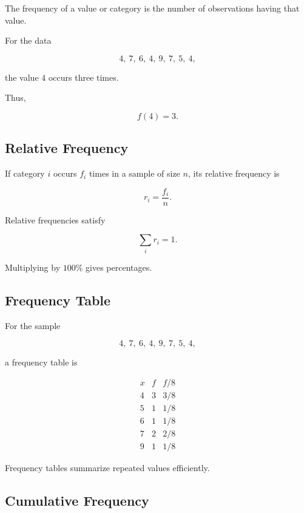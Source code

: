 The frequency of a value or category is the number of observations
having that value.

For the data

\[
4,\ 7,\ 6,\ 4,\ 9,\ 7,\ 5,\ 4,
\]

the value \(4\) occurs three times.

Thus,

\[
\boxed{
f(4)=3.
}
\]

\subsection{Relative Frequency}
\label{subsec:relative-frequency}

If category \(i\) occurs \(f_i\) times in a sample of size \(n\), its
relative frequency is

\[
\boxed{
r_i
=
\frac{f_i}{n}.
}
\]

Relative frequencies satisfy

\[
\boxed{
\sum_i r_i=1.
}
\]

Multiplying by \(100\%\) gives percentages.

\subsection{Frequency Table}
\label{subsec:frequency-table}

For the sample

\[
4,\ 7,\ 6,\ 4,\ 9,\ 7,\ 5,\ 4,
\]

a frequency table is

\[
\begin{array}{c|c|c}
x & f & f/8\\
\hline
4&3&3/8\\
5&1&1/8\\
6&1&1/8\\
7&2&2/8\\
9&1&1/8
\end{array}
\]

Frequency tables summarize repeated values efficiently.

\subsection{Cumulative Frequency}
\label{subsec:cumulative-frequency}

